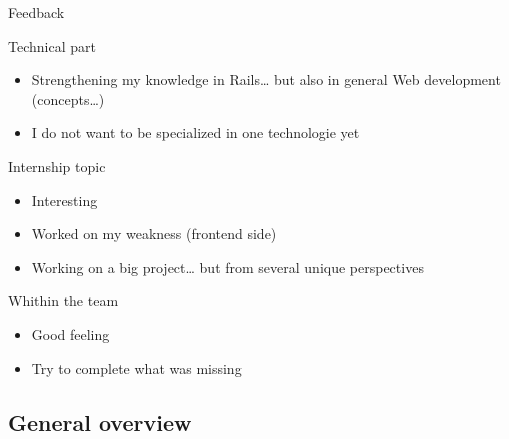\documentclass[10pt,a4paper]{beamer}
\begin{document}
\begin{frame}{Feedback}
  \begin{block}{Technical part}
    \begin{itemize}
      \item Strengthening my knowledge in Rails… but also in general Web development (concepts…)
      \item I do not want to be specialized in one technologie yet
    \end{itemize}
  \end{block}
  
  \begin{block}{Internship topic}
    \begin{itemize}
      \item Interesting
      \item Worked on my weakness (frontend side)
      \item Working on a big project… but from several unique perspectives
    \end{itemize}
  \end{block}
  
  \begin{block}{Whithin the team}
    \begin{itemize}
      \item Good feeling
      \item Try to complete what was missing
    \end{itemize}
  \end{block}
\end{frame}

\subsection{General overview}
\end{document}
